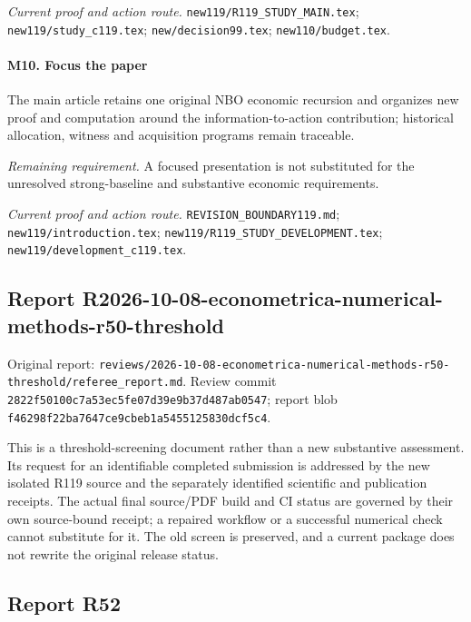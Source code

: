 \par\emph{Current proof and action route.} \nolinkurl{new119/R119_STUDY_MAIN.tex}; \nolinkurl{new119/study_c119.tex}; \nolinkurl{new/decision99.tex}; \nolinkurl{new110/budget.tex}.

\paragraph{M10. Focus the paper}

The main article retains one original NBO economic recursion and organizes new proof and computation around the information-to-action contribution; historical allocation, witness and acquisition programs remain traceable.

\par\emph{Remaining requirement.} A focused presentation is not substituted for the unresolved strong-baseline and substantive economic requirements.

\par\emph{Current proof and action route.} \nolinkurl{REVISION_BOUNDARY119.md}; \nolinkurl{new119/introduction.tex}; \nolinkurl{new119/R119_STUDY_DEVELOPMENT.tex}; \nolinkurl{new119/development_c119.tex}.

\subsection{Report R2026-10-08-econometrica-numerical-methods-r50-threshold}

Original report: \nolinkurl{reviews/2026-10-08-econometrica-numerical-methods-r50-threshold/referee_report.md}. Review commit \nolinkurl{2822f50100c7a53ec5fe07d39e9b37d487ab0547}; report blob \nolinkurl{f46298f22ba7647ce9cbeb1a5455125830dcf5c4}.

This is a threshold-screening document rather than a new substantive assessment. Its request for an identifiable completed submission is addressed by the new isolated R119 source and the separately identified scientific and publication receipts. The actual final source/PDF build and CI status are governed by their own source-bound receipt; a repaired workflow or a successful numerical check cannot substitute for it. The old screen is preserved, and a current package does not rewrite the original release status.

\subsection{Report R52}

